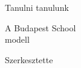 \begin{titlepage} %

	\centering %
	
	\scshape %
	
	\vspace*{\baselineskip} %
	
	
	
	\vspace{0.75\baselineskip} %
	
	{\LARGE Tanulni tanulunk\\} %
	
	\vspace{0.75\baselineskip} %
	
	
	\vspace{2\baselineskip} %
	
	
	
    A Budapest School\\
    modell
	
	\vspace*{3\baselineskip} %
	
	
	Szerkesztette
	
	\vspace{0.5\baselineskip} %
	

\end{titlepage}
